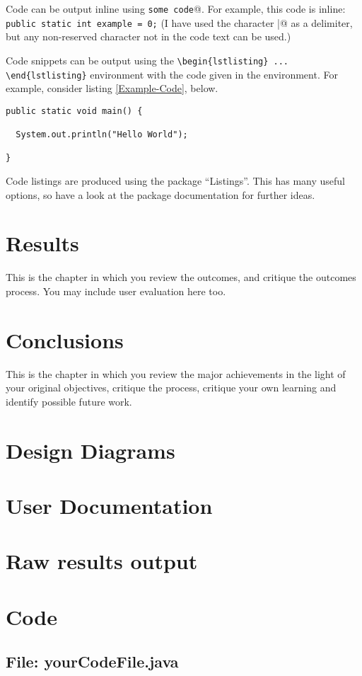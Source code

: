 \documentclass[11pt,openright,a4paper]{report}
\begin{document}
Code can be output inline using \verb@\lstinline|some code|@.  For example,
this code is inline: \lstinline|public static int example = 0;|  (I have
used the character \verb@|@ as a delimiter, but any non-reserved character
not in the code text can be used.)

Code snippets can be output using the \verb|\begin{lstlisting} ... \end{lstlisting}|
environment with the code given in the environment.  For
example, consider listing \ref{Example-Code}, below.

\begin{lstlisting}[breaklines,breakatwhitespace,caption={Example code},label=Example-Code]
public static void main() {

  System.out.println("Hello World");

}
\end{lstlisting}

Code listings are produced using the package ``Listings''.  This has many
useful options, so have a look at the package documentation for further
ideas.


\chapter{Results}
This is the chapter in which you review the outcomes, and
critique the outcomes process.  You may include user evaluation here
too.



\chapter*{Conclusions}
%

This is the chapter in which you review the major achievements in the
light of your original objectives, critique the process, critique your
own learning and identify possible future work.




\appendix

\chapter*{Design Diagrams}

\chapter*{User Documentation}

\chapter*{Raw results output}

\chapter*{Code}


\begin{landscape}
\begin{multicols}{2}
\section{File: yourCodeFile.java}

\end{multicols}
\end{landscape}
\end{document}
